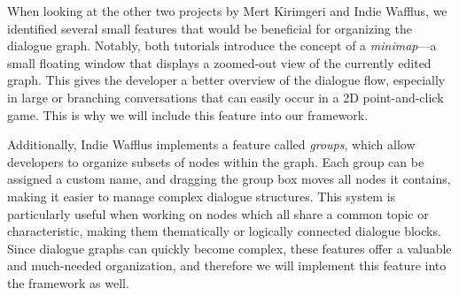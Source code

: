 When looking at the other two projects by Mert Kirimgeri and Indie Wafflus, we identified several small features that would be beneficial for organizing the dialogue graph. Notably, both tutorials introduce the concept of a \textit{minimap}—a small floating window that displays a zoomed-out view of the currently edited graph. This gives the developer a better overview of the dialogue flow, especially in large or branching conversations that can easily occur in a 2D point-and-click game. This is why we will include this feature into our framework. 

Additionally, Indie Wafflus implements a feature called \textit{groups}, which allow developers to organize subsets of nodes within the graph. Each group can be assigned a custom name, and dragging the group box moves all nodes it contains, making it easier to manage complex dialogue structures. This system is particularly useful when working on nodes which all share a common topic or characteristic, making them thematically or logically connected dialogue blocks. Since dialogue graphs can quickly become complex, these features offer a valuable and much-needed organization, and therefore we will implement this feature into the framework as well. 